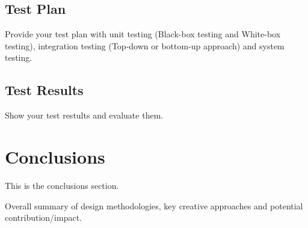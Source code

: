 \documentclass{article}
\begin{document}
\subsection{Test Plan}
Provide your test plan with unit testing (Black-box testing and White-box testing), integration testing (Top-down or bottom-up approach) and system testing.

\subsection{Test Results}
Show your test restults and evaluate them. 

\section{Conclusions}
This is the conclusions section.

Overall summary of design methodologies, key creative approaches and potential
contribution/impact. \cite{hahahaha}





 
\end{document}
